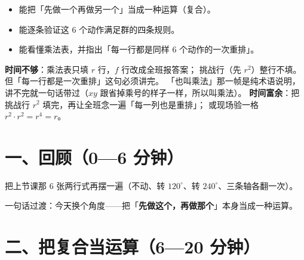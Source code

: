 

\begin{mubiao}
  \begin{itemize}
    \item 能把「先做一个再做另一个」当成一种运算（复合）。
    \item 能逐条验证这 \(6\) 个动作满足群的四条规则。
    \item 能看懂乘法表，并指出「每一行都是同样 \(6\) 个动作的一次重排」。
  \end{itemize}
\end{mubiao}


\begin{beifen}
  \textbf{时间不够}：乘法表只填 \(r\) 行，\(f\) 行改成全班报答案；
  挑战行（先 \(r^2\)）整行不填。但「每一行都是一次重排」这句必须讲完。
  「也叫乘法」那一帧是纯术语说明，讲不完就一句话带过（\(xy\) 跟省掉乘号的样子一样，所以叫乘法）。
  \textbf{时间富余}：把挑战行 \(r^2\) 填完，再让全班念一遍「每一列也是重排」；
  或现场验一格 \(r^2\cdot r^2=r^4=r\)。
\end{beifen}

\section*{一、回顾（0—6 分钟）}

把上节课那 \(6\) 张两行式再摆一遍（不动、转 \(120^\circ\)、转 \(240^\circ\)、三条轴各翻一次）。

一句话过渡：今天换个角度——把「\textbf{先做这个，再做那个}」本身当成一种运算。

\section*{二、把复合当运算（6—20 分钟）}

